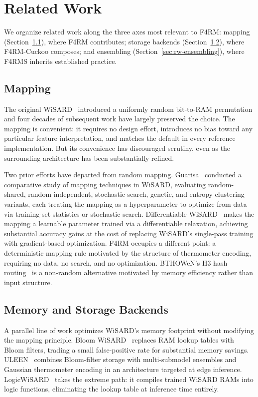 
\section{Related Work}
\label{sec:related}

We organize related work along the three axes most relevant to F4RM: mapping (Section~\ref{sec:rw-mapping}), where F4RM contributes; storage backends (Section~\ref{sec:rw-memory}), where F4RM-Cuckoo composes; and ensembling (Section~\ref{sec:rw-ensembling}), where F4RMS inherits established practice.

\subsection{Mapping}
\label{sec:rw-mapping}

The original WiSARD~\cite{aleksander1984wisard} introduced a uniformly random bit-to-RAM permutation and four decades of subsequent work have largely preserved the choice. The mapping is convenient: it requires no design effort, introduces no bias toward any particular feature interpretation, and matches the default in every reference implementation. But its convenience has discouraged scrutiny, even as the surrounding architecture has been substantially refined.

Two prior efforts have departed from random mapping. Guarisa~\cite{guarisa2020thesis} conducted a comparative study of mapping techniques in WiSARD, evaluating random-shared, random-independent, stochastic-search, genetic, and entropy-clustering variants, each treating the mapping as a hyperparameter to optimize from data via training-set statistics or stochastic search. Differentiable WiSARD~\cite{bacellar2024dwn} makes the mapping a learnable parameter trained via a differentiable relaxation, achieving substantial accuracy gains at the cost of replacing WiSARD's single-pass training with gradient-based optimization. F4RM occupies a different point: a deterministic mapping rule motivated by the structure of thermometer encoding, requiring no data, no search, and no optimization. BTHOWeN's H3 hash routing~\cite{susskind2022bthowen} is a non-random alternative motivated by memory efficiency rather than input structure.

\subsection{Memory and Storage Backends}
\label{sec:rw-memory}

A parallel line of work optimizes WiSARD's memory footprint without modifying the mapping principle. Bloom WiSARD~\cite{santiago2020bloom} replaces RAM lookup tables with Bloom filters, trading a small false-positive rate for substantial memory savings. ULEEN~\cite{susskind2023uleen} combines Bloom-filter storage with multi-submodel ensembles and Gaussian thermometer encoding in an architecture targeted at edge inference. LogicWiSARD~\cite{bacellar2022logicwisard} takes the extreme path: it compiles trained WiSARD RAMs into logic functions, eliminating the lookup table at inference time entirely.

